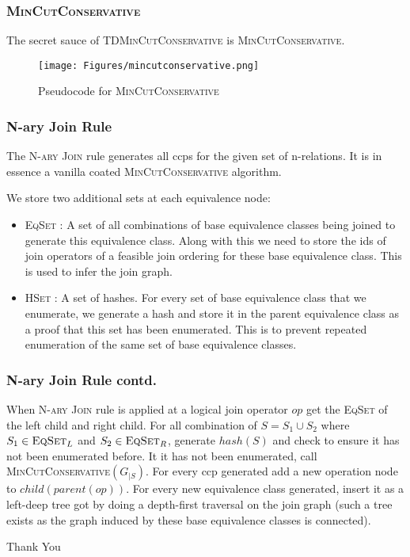 \documentclass{beamer}
\begin{document}
  \begin{frame}
  \frametitle{\textsc{MinCutConservative}}
The secret sauce of \textsc{TDMinCutConservative} is \textsc{MinCutConservative}.

\begin{figure}[here]
\texttt{[image: Figures/mincutconservative.png]}
\caption{Pseudocode for \textsc{MinCutConservative}}
\label{fig:mincutconservative}
\end{figure}
  \end{frame}
  
\begin{frame}
\frametitle{N-ary Join Rule}
The \textsc{N-ary Join} rule generates all ccps for the given set of n-relations. It is in essence a vanilla coated \textsc{MinCutConservative} algorithm. \vspace{\baselineskip}

We store two additional sets at each equivalence node:

\begin{itemize}
	\item \textsc{EqSet} : A set of all combinations of base equivalence classes being joined to generate this equivalence class. Along with this we need to store the ids of join operators of a feasible join ordering for these base equivalence class. This is used to infer the join graph.
	\item \textsc{HSet} : A set of hashes. For every set of base equivalence class that we enumerate, we generate a hash and store it in the parent equivalence class as a proof that this set has been enumerated. This is to prevent repeated enumeration of the same set of base equivalence classes.
\end{itemize}
\end{frame}

\begin{frame}
\frametitle{N-ary Join Rule contd.}
When \textsc{N-ary Join} rule is applied at a logical join operator $op$ get the \textsc{EqSet} of the left child and right child. For all combination of $S=S_{1} \cup S_{2}$ where $S_{1}\in \textsc{EqSet}_{L}$ and $S_{2}\in \textsc{EqSet}_{R}$, generate $hash(S)$ and check to ensure it has not been enumerated before. It it has not been enumerated, call \textsc{MinCutConservative}$(G_{|S})$. For every ccp generated add a new operation node to $child(parent(op))$. For every new equivalence class generated, insert it as a left-deep tree got by doing a depth-first traversal on the join graph (such a tree exists as the graph induced by these base equivalence classes is connected).
\end{frame}

\begin{frame}

\Huge Thank You

\end{frame}
\end{document}
